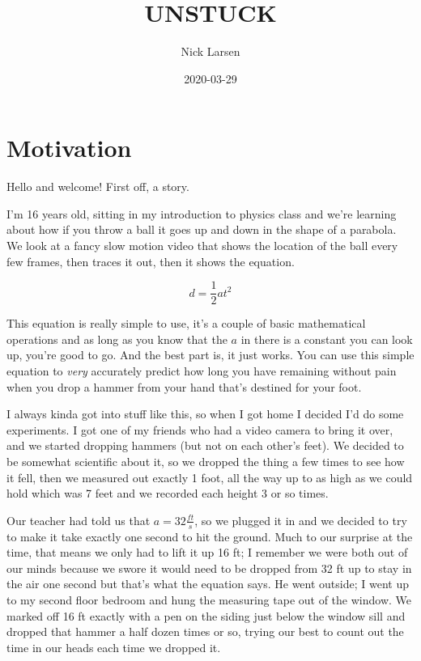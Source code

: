 \documentclass[]{book}
\title{UNSTUCK}
\author{Nick Larsen}
\date{2020-03-29}
\begin{document}
\maketitle

{
\setcounter{tocdepth}{1}
\tableofcontents
}
\chapter*{Motivation}\label{motivation}

Hello and welcome! First off, a story.

I'm 16 years old, sitting in my introduction to physics class and we're
learning about how if you throw a ball it goes up and down in the shape
of a parabola. We look at a fancy slow motion video that shows the
location of the ball every few frames, then traces it out, then it shows
the equation.

\[d = \frac{1}{2}at^2\]

This equation is really simple to use, it's a couple of basic
mathematical operations and as long as you know that the \(a\) in there
is a constant you can look up, you're good to go. And the best part is,
it just works. You can use this simple equation to \emph{very}
accurately predict how long you have remaining without pain when you
drop a hammer from your hand that's destined for your foot.

I always kinda got into stuff like this, so when I got home I decided
I'd do some experiments. I got one of my friends who had a video camera
to bring it over, and we started dropping hammers (but not on each
other's feet). We decided to be somewhat scientific about it, so we
dropped the thing a few times to see how it fell, then we measured out
exactly 1 foot, all the way up to as high as we could hold which was 7
feet and we recorded each height 3 or so times.

Our teacher had told us that \(a = 32\frac{ft}{s}\), so we plugged it in
and we decided to try to make it take exactly one second to hit the
ground. Much to our surprise at the time, that means we only had to lift
it up 16 ft; I remember we were both out of our minds because we swore
it would need to be dropped from 32 ft up to stay in the air one second
but that's what the equation says. He went outside; I went up to my
second floor bedroom and hung the measuring tape out of the window. We
marked off 16 ft exactly with a pen on the siding just below the window
sill and dropped that hammer a half dozen times or so, trying our best
to count out the time in our heads each time we dropped it.
\end{document}
